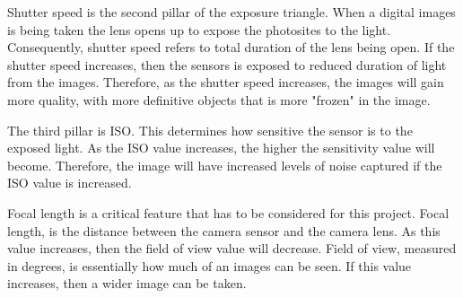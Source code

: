  Shutter speed is the second pillar of the exposure triangle. When a digital images is being taken the lens opens up to expose the photosites to the light. Consequently, shutter speed refers to total duration of the lens being open. If the shutter speed increases, then the sensors is exposed to reduced duration of light from the images. Therefore, as the shutter speed increases, the images will gain more quality, with more definitive objects that is more "frozen" in the image. \citep{CC-CE}

The third pillar is ISO. This determines how sensitive the sensor is to the exposed light. As the ISO value increases, the higher the sensitivity value will become. Therefore, the image will have increased levels of noise captured if the ISO value is increased. \citep{CC-CE}

Focal length is a critical feature that has to be considered for this project. Focal length, is the distance between the camera sensor and the camera lens. As this value increases, then the field of view value will decrease. Field of view, measured in degrees, is essentially how much of an images can be seen. If this value increases, then a wider image can be taken. \citep{DM-FOW}






